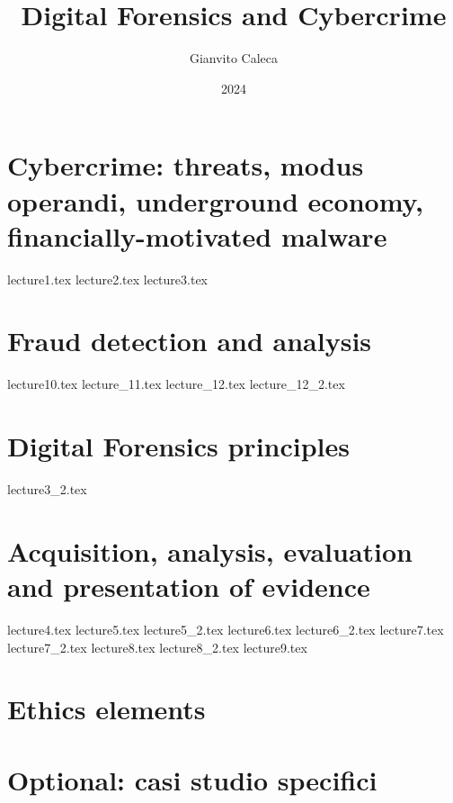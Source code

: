 \documentclass{report}
\title{Digital Forensics and Cybercrime}
\date{2024}
\author{Gianvito Caleca}
\begin{document}
\maketitle
\tableofcontents
\part{Cybercrime: threats, modus operandi, underground economy, financially-motivated malware}
{lecture1.tex}
{lecture2.tex}
{lecture3.tex}
\part{Fraud detection and analysis}
{lecture10.tex}
{lecture_11.tex}
{lecture_12.tex}
{lecture_12_2.tex}
\part{Digital Forensics principles}
{lecture3_2.tex}
\part{Acquisition, analysis, evaluation and presentation of evidence}
{lecture4.tex}
{lecture5.tex}
{lecture5_2.tex}
{lecture6.tex}
{lecture6_2.tex}
{lecture7.tex}
{lecture7_2.tex}
{lecture8.tex}
{lecture8_2.tex}
{lecture9.tex}
\part{Ethics elements}
\part{Optional: casi studio specifici}
\end{document}
